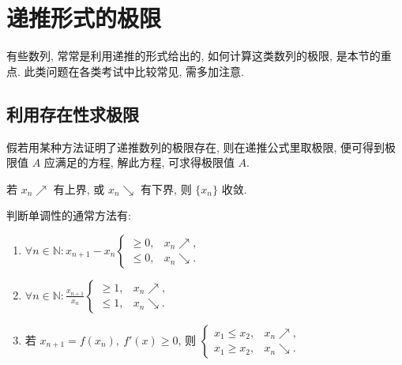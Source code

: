\section{递推形式的极限}

有些数列, 常常是利用递推的形式给出的, 如何计算这类数列的极限, 是本节的重点.
此类问题在各类考试中比较常见, 需多加注意.

\subsection{利用存在性求极限}

假若用某种方法证明了递推数列的极限存在, 则在递推公式里取极限, 便可得到极限值 $A$ 应满足的方程, 解此方程, 可求得极限值 $A$.

\begin{theorem}[单调有界准理]
    若 $x_n\nearrow$ 有上界, 或 $x_n\searrow$ 有下界, 则 $\{x_n\}$ 收敛.
\end{theorem}
判断单调性的通常方法有:
\begin{enumerate}[label=(\arabic{*})]
    \item $\displaystyle\forall n\in \mathbb{N}:x_{n+1}-x_n\begin{cases}\geqslant 0,&x_n\nearrow,\\ \leqslant 0,&x_n\searrow.\end{cases}$
    \item $\displaystyle\forall n\in\mathbb{N}:\frac{x_{n+1}}{x_n}\begin{cases}\geqslant 1,&x_n\nearrow,\\ \leqslant 1,&x_n\searrow.\end{cases}$
    \item 若 $x_{n+1}=f(x_n),~f'(x)\geqslant 0\text{, 则 }\begin{cases}x_1\leqslant x_2,&x_n\nearrow,\\ x_1\geqslant x_2,&x_n\searrow.\end{cases} $
\end{enumerate}

